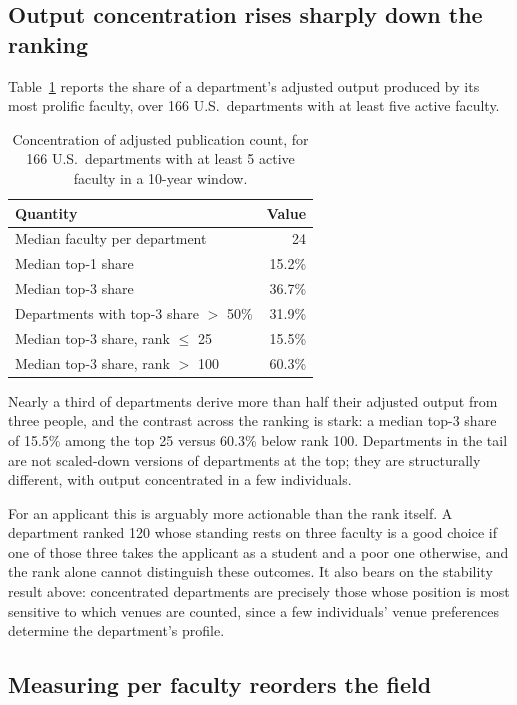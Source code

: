 \documentclass[11pt]{article}
\begin{document}
\subsection{Output concentration rises sharply down the ranking}
\label{sec:concentration}

Table~\ref{tab:concentration} reports the share of a department's adjusted
output produced by its most prolific faculty, over 166 U.S.\ departments with
at least five active faculty.

\begin{table}[t]
\centering
\caption{Concentration of adjusted publication count, for 166 U.S.\
departments with at least 5 active faculty in a 10-year window.}
\label{tab:concentration}
\begin{tabular}{lr}
\toprule
Quantity & Value \\
\midrule
Median faculty per department          & 24 \\
Median top-1 share                     & 15.2\% \\
Median top-3 share                     & 36.7\% \\
Departments with top-3 share $>$ 50\%  & 31.9\% \\
\midrule
Median top-3 share, rank $\le$ 25      & 15.5\% \\
Median top-3 share, rank $>$ 100       & 60.3\% \\
\bottomrule
\end{tabular}
\end{table}

Nearly a third of departments derive more than half their adjusted output from
three people, and the contrast across the ranking is stark: a median top-3
share of 15.5\% among the top 25 versus 60.3\% below rank 100. Departments in
the tail are not scaled-down versions of departments at the top; they are
structurally different, with output concentrated in a few individuals.

For an applicant this is arguably more actionable than the rank itself. A
department ranked 120 whose standing rests on three faculty is a good choice if
one of those three takes the applicant as a student and a poor one otherwise,
and the rank alone cannot distinguish these outcomes. It also bears on the
stability result above: concentrated departments are precisely those whose
position is most sensitive to which venues are counted, since a few
individuals' venue preferences determine the department's profile.

\subsection{Measuring per faculty reorders the field}
\label{sec:percapitaresults}
\end{document}
